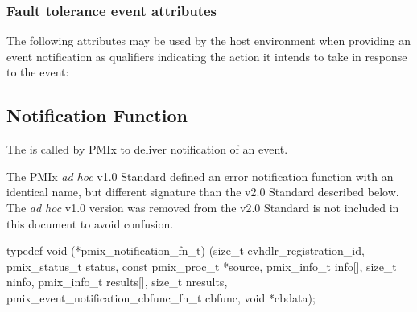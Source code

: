 \subsubsection{Fault tolerance event attributes}
\label{api:struct:attributes:ft}

The following attributes may be used by the host environment when providing an event notification as qualifiers indicating the action it intends to take in response to the event:

%
%
%
%
%

\subsection{Notification Function}

\summary

The  is called by \ac{PMIx} to deliver notification of an event.

\adviceuserstart
The \ac{PMIx} \textit{ad hoc} v1.0 Standard defined an error notification function with an identical name, but different signature than the v2.0 Standard described below. The \textit{ad hoc} v1.0 version was removed from the v2.0 Standard is not included in this document to avoid confusion.
\adviceuserend


\cspecificstart
\begin{codepar}
typedef void (*pmix_notification_fn_t)
    (size_t evhdlr_registration_id,
     pmix_status_t status,
     const pmix_proc_t *source,
     pmix_info_t info[], size_t ninfo,
     pmix_info_t results[], size_t nresults,
     pmix_event_notification_cbfunc_fn_t cbfunc,
     void *cbdata);
\end{codepar}
\cspecificend

